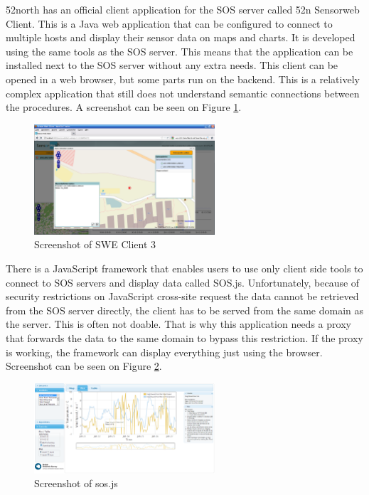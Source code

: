 52north has an official client application for the SOS server called 52n Sensorweb Client. This is a Java web application that can be configured to connect to multiple hosts and display their sensor data on maps and charts. It is developed using the same tools as the SOS server. 
This means that the application can be installed next to the SOS server without any extra needs. This client can be opened in a web browser, but some parts run on the backend. This is a relatively complex application that still does not understand semantic connections between the procedures. A screenshot can be seen on Figure \ref{fig:sweclient}.

\begin{figure}[h]
\centering
\includegraphics[width=0.6\textwidth]{figures/sweclient.png}
\caption{Screenshot of SWE Client 3\label{fig:sweclient}}
\end{figure}

There is a JavaScript framework that enables users to use only client side tools to connect to SOS servers and display data called SOS.js. Unfortunately, because of security restrictions on JavaScript cross-site request the data cannot be retrieved from the SOS server directly, the client has to be served from the same domain as the server. This is often not doable. That is why this application needs a proxy that forwards the data to the same domain to bypass this restriction. If the proxy is working, the framework can display everything just using the browser. Screenshot can be seen on Figure \ref{fig:sos-js}.

\begin{figure}[h]
\centering
\includegraphics[width=0.6\textwidth]{figures/sos-js.png}
\caption{Screenshot of sos.js\label{fig:sos-js}}
\end{figure}

